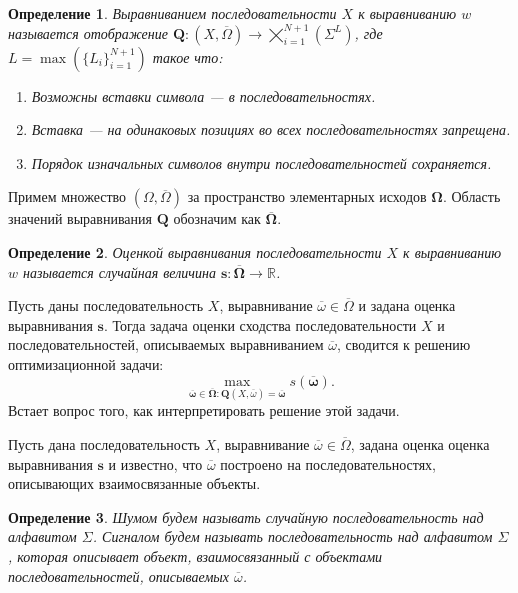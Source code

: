\documentclass[specialist,
substylefile = spbu_report.rtx,
subf,href,colorlinks=true, 12pt]{disser}
\newtheorem{defenition}{Определение}
\begin{document}
		\begin{defenition}
			Выравниванием последовательности $X$ к выравниванию $w$ называется отображение $\boldsymbol{Q}: (X, \overline{\Omega}) \rightarrow \bigtimes_{i=1}^{N+1}(\Sigma^{L})$, где $L = \max(\{L_i\}_{i=1}^{N+1})$ такое что:
			\begin{enumerate}
				\item Возможны вставки символа --- в последовательностях.
				\item Вставка --- на одинаковых позициях во всех последовательностях запрещена.
				\item Порядок изначальных символов внутри последовательностей сохраняется.
			\end{enumerate}
		\end{defenition}
		
		Примем множество $(\Omega, \overline \Omega)$ за пространство элементарных исходов $\boldsymbol{\Omega}$. Область значений выравнивания $\boldsymbol Q$ обозначим как $\overline{\boldsymbol{\Omega}}$.
		
		\begin{defenition}				
			Оценкой выравнивания последовательности $X$ к выравниванию $w$ называется случайная величина $\boldsymbol s:\overline{\boldsymbol{\Omega}} \rightarrow \mathbb{R}$.
		\end{defenition}
	
		Пусть даны последовательность $X$, выравнивание $\overline{\omega} \in \overline{\Omega}$ и задана оценка выравнивания $\boldsymbol{s}$. Тогда задача оценки сходства последовательности $X$ и последовательностей, описываемых выравниванием $\overline{\omega}$, сводится к решению оптимизационной задачи:		
		\begin{equation*}
			\max_{\overline{\boldsymbol{\omega}} \in \overline{\boldsymbol{\Omega}} : \boldsymbol{Q}(X, \overline{\omega}) = \overline{\boldsymbol{\omega}}}s(\overline{\boldsymbol{\omega}}). \label{eq:2}
		\end{equation*}		
		Встает вопрос того, как интерпретировать решение этой задачи. 
		
		Пусть дана последовательность $X$, выравнивание $\overline{\omega} \in \overline{\Omega}$, задана оценка оценка выравнивания $\boldsymbol{s}$ и известно, что $\overline{\omega}$ построено на последовательностях, описывающих взаимосвязанные объекты.
		\begin{defenition}
			Шумом будем называть случайную последовательность над алфавитом $\Sigma$. Сигналом будем называть последовательность над алфавитом $\Sigma$, которая описывает объект, взаимосвязанный с объектами последовательностей, описываемых $\overline{\omega}$.
		\end{defenition}
		
\end{document}
